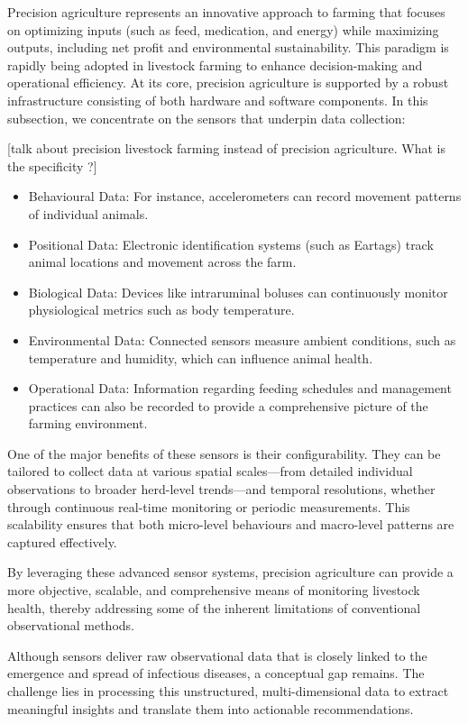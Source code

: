 Precision agriculture represents an innovative approach to farming that focuses on optimizing inputs (such as feed, medication, and energy) while maximizing outputs, including net profit and environmental sustainability. This paradigm is rapidly being adopted in livestock farming to enhance decision-making and operational efficiency. At its core, precision agriculture is supported by a robust infrastructure consisting of both hardware and software components. In this subsection, we concentrate on the sensors that underpin data collection:

[talk about precision livestock farming instead of precision agriculture. What is the specificity ?]


\begin{itemize}
    \item Behavioural Data: For instance, accelerometers can record movement patterns of individual animals.
    \item Positional Data: Electronic identification systems (such as Eartags) track animal locations and movement across the farm.
    \item Biological Data: Devices like intraruminal boluses can continuously monitor physiological metrics such as body temperature.
    \item Environmental Data: Connected sensors measure ambient conditions, such as temperature and humidity, which can influence animal health.
    \item Operational Data: Information regarding feeding schedules and management practices can also be recorded to provide a comprehensive picture of the farming environment.
\end{itemize}

One of the major benefits of these sensors is their configurability. They can be tailored to collect data at various spatial scales—from detailed individual observations to broader herd-level trends—and temporal resolutions, whether through continuous real-time monitoring or periodic measurements. This scalability ensures that both micro-level behaviours and macro-level patterns are captured effectively. 

By leveraging these advanced sensor systems, precision agriculture can provide a more objective, scalable, and comprehensive means of monitoring livestock health, thereby addressing some of the inherent limitations of conventional observational methods.

Although sensors deliver raw observational data that is closely linked to the emergence and spread of infectious diseases, a conceptual gap remains. The challenge lies in processing this unstructured, multi-dimensional data to extract meaningful insights and translate them into actionable recommendations.

